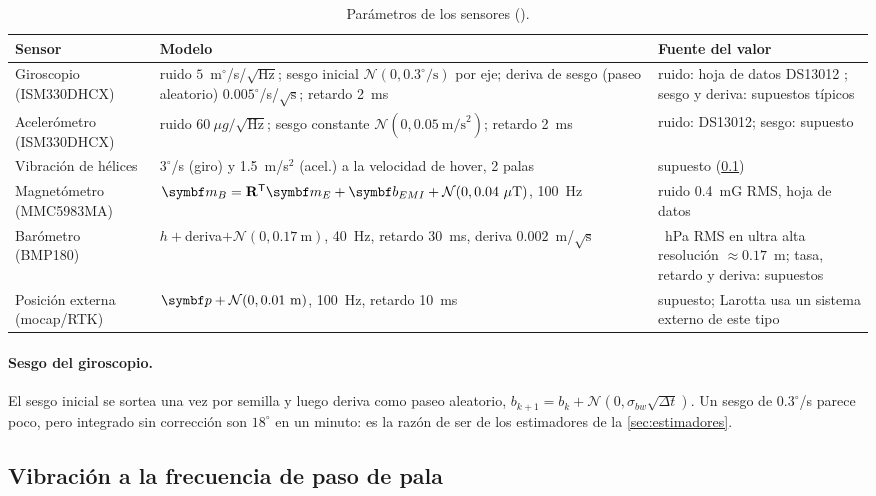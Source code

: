 \begin{table}[H]
\centering
\small
\caption{Parámetros de los sensores ().}
\label{tab:sensores}
\begin{tabularx}{\textwidth}{>{\raggedright\arraybackslash}p{3.4cm}>{\raggedright\arraybackslash}X>{\raggedright\arraybackslash}p{4.6cm}}
\toprule
Sensor & Modelo & Fuente del valor \\
\midrule
Giroscopio (ISM330DHCX) & ruido $5$~m$^\circ$/s/$\sqrt{\text{Hz}}$; sesgo inicial $\mathcal N(0,0.3^\circ/\text{s})$ por eje; deriva de sesgo (paseo aleatorio) $0.005^\circ$/s/$\sqrt{\text{s}}$; retardo 2~ms & ruido: hoja de datos DS13012 \cite{ism330}; sesgo y deriva: supuestos típicos \\
Acelerómetro (ISM330DHCX) & ruido $60~\mu g/\sqrt{\text{Hz}}$; sesgo constante $\mathcal N(0,0.05~\text{m/s}^2)$; retardo 2~ms & ruido: DS13012; sesgo: supuesto \\
Vibración de hélices & $3^\circ$/s (giro) y 1.5~m/s$^2$ (acel.) a la velocidad de hover, 2 palas & supuesto (\cref{sec:vibracion}) \\
Magnetómetro (MMC5983MA) & $\vect m_B=\R\T\vect m_E+\vect b_{EMI}+\mathcal N(0,0.04~\mu\text{T})$, 100~Hz & ruido 0.4~mG RMS, hoja de datos \cite{mmc5983} \\
Barómetro (BMP180) & $h+$deriva$+\mathcal N(0,0.17~\text{m})$, 40~Hz, retardo 30~ms, deriva $0.002$~m/$\sqrt{\text{s}}$ & 0.02~hPa RMS en ultra alta resolución \cite{bmp180} $\approx0.17$~m; tasa, retardo y deriva: supuestos \\
Posición externa (mocap/RTK) & $\vect p+\mathcal N(0,0.01~\text{m})$, 100~Hz, retardo 10~ms & supuesto; Larotta \cite{larotta24} usa un sistema externo de este tipo \\
\bottomrule
\end{tabularx}
\end{table}

\paragraph{Sesgo del giroscopio.} El sesgo inicial se sortea una vez por
semilla y luego deriva como paseo aleatorio,
$b_{k+1}=b_k+\mathcal N(0,\sigma_{bw}\sqrt{\Delta t})$. Un sesgo de
$0.3^\circ$/s parece poco, pero integrado sin corrección son $18^\circ$ en un
minuto: es la razón de ser de los estimadores de la \cref{sec:estimadores}.

\subsection{Vibración a la frecuencia de paso de pala}
\label{sec:vibracion}

